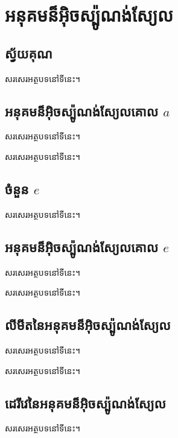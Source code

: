 \documentclass[11pt,a4paper]{book}
\begin{document}
	\chapter{អនុគមន៏អ៊ិចស្ប៉ូណង់ស្យែល}
	\section{ស្វ័យគុណ}
	\begin{definition}{}{}
		សរសេរអត្ថបទនៅទីនេះ។
	\end{definition}
	\section{អនុគមន៏អ៊ិចស្ប៉ូណង់ស្យែលគោល $ a $}
	\begin{definition}{}{}
		សរសេរអត្ថបទនៅទីនេះ។
	\end{definition}
	\begin{property}{}{}
		សរសេរអត្ថបទនៅទីនេះ។
	\end{property}
	\section{ចំនួន $ e $}
	\begin{definition}{}{}
		សរសេរអត្ថបទនៅទីនេះ។
	\end{definition}
	\section{អនុគមន៏អ៊ិចស្ប៉ូណង់ស្យែលគោល $ e $}
	\begin{definition}{}{}
		សរសេរអត្ថបទនៅទីនេះ។
	\end{definition}
	\begin{property}{}{}
		សរសេរអត្ថបទនៅទីនេះ។
	\end{property}
	\section{លីមីតនៃអនុគមន៏អ៊ិចស្ប៉ូណង់ស្យែល}
	\begin{theorem}{}{}
		សរសេរអត្ថបទនៅទីនេះ។
	\end{theorem}
	\begin{property}{}{}
		សរសេរអត្ថបទនៅទីនេះ។
	\end{property}
	\section{ដេរីវេនៃអនុគមន៏អ៊ិចស្ប៉ូណង់ស្យែល}
	\begin{property}{}{}
		សរសេរអត្ថបទនៅទីនេះ។
	\end{property}
\end{document}
